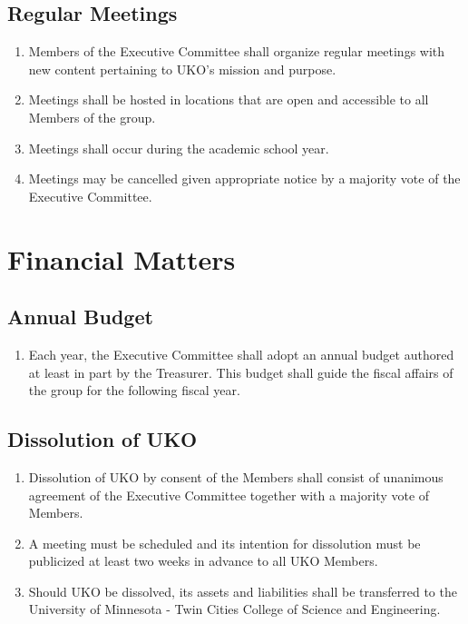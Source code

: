 \documentclass[12pt,executivepaper]{article}
\begin{document}
\subsection{Regular Meetings}
\begin{enumerate}
    \item Members of the Executive Committee shall organize regular meetings
          with new content pertaining to UKO's mission and purpose.
    \item Meetings shall be hosted in locations that are open and accessible
          to all Members of the group.
    \item Meetings shall occur during the academic school year.
    \item Meetings may be cancelled given appropriate notice by a majority
          vote of the Executive Committee.
\end{enumerate}

\section{Financial Matters}

\subsection{Annual Budget}
\begin{enumerate}
    \item Each year, the Executive Committee shall adopt an annual budget
          authored at least in part by the Treasurer. This budget shall guide
          the fiscal affairs of the group for the following fiscal year.
\end{enumerate}

\subsection{Dissolution of UKO}
\begin{enumerate}
    \item Dissolution of UKO by consent of the Members shall consist of
          unanimous agreement of the Executive Committee together with a
          majority vote of Members.
    \item A meeting must be scheduled and its intention for dissolution must
          be publicized at least two weeks in advance to all UKO Members.
    \item Should UKO be dissolved, its assets and liabilities shall be
          transferred to the University of Minnesota - Twin Cities College of
          Science and Engineering.
\end{enumerate}
\end{document}
